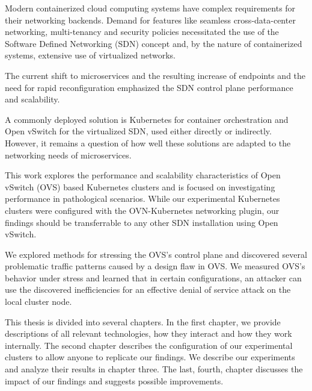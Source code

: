 


Modern containerized cloud computing systems have complex requirements for their networking backends. Demand for features like seamless cross-data-center networking, multi-tenancy and security policies necessitated the use of the Software Defined Networking (SDN) concept and, by the nature of containerized systems, extensive use of virtualized networks.

The current shift to microservices and the resulting increase of endpoints and the need for rapid reconfiguration emphasized the SDN control plane performance and scalability.

A commonly deployed solution is Kubernetes for container orchestration and Open vSwitch for the virtualized SDN, used either directly or indirectly. However, it remains a question of how well these solutions are adapted to the networking needs of microservices.

This work explores the performance and scalability characteristics of Open vSwitch (OVS) based Kubernetes clusters and is focused on investigating performance in pathological scenarios. While our experimental Kubernetes clusters were configured with the OVN-Kubernetes networking plugin, our findings should be transferrable to any other SDN installation using Open vSwitch.

We explored methods for stressing the OVS's control plane and discovered several problematic traffic patterns caused by a design flaw in OVS. We measured OVS's behavior under stress and learned that in certain configurations, an attacker can use the discovered inefficiencies for an effective denial of service attack on the local cluster node.

This thesis is divided into several chapters. In the first chapter, we provide descriptions of all relevant technologies, how they interact and how they work internally. The second chapter describes the configuration of our experimental clusters to allow anyone to replicate our findings. We describe our experiments and analyze their results in chapter three. The last, fourth, chapter discusses the impact of our findings and suggests possible improvements.



%
